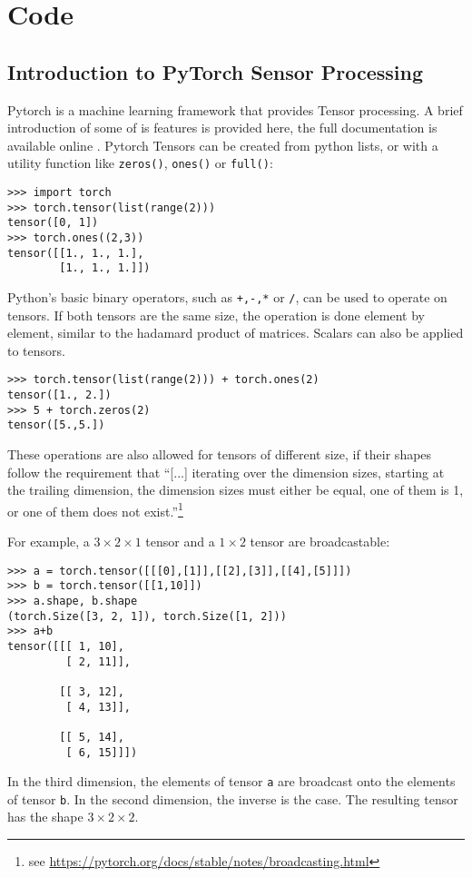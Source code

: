 \chapter{Code}
\section{Introduction to PyTorch Sensor Processing}
\label{app:pytorch_tutorial}
Pytorch is a machine learning framework that provides Tensor processing.
A brief introduction of some of is features is provided here,
the full documentation is available online \cite{pytorch}.
Pytorch Tensors can be created from python lists,
or with a utility function like \verb|zeros()|, \verb|ones()| or \verb|full()|:
\begin{lstlisting}
>>> import torch
>>> torch.tensor(list(range(2)))
tensor([0, 1])
>>> torch.ones((2,3))
tensor([[1., 1., 1.],
        [1., 1., 1.]])
\end{lstlisting}

Python's basic binary operators, such as \verb|+,-,*| or \verb|/|, can be used to operate on tensors.
If both tensors are the same size, the operation is done element by element, similar to the hadamard product of matrices.
Scalars can also be applied to tensors.
\begin{lstlisting}
>>> torch.tensor(list(range(2))) + torch.ones(2)
tensor([1., 2.])
>>> 5 + torch.zeros(2)
tensor([5.,5.])
\end{lstlisting}

These operations are also allowed for tensors of different size, if their shapes follow the requirement that
``[...] iterating over the dimension sizes, starting at the trailing dimension,
the dimension sizes must either be equal, one of them is 1, or one of them does not exist.''\footnote{
    see \url{https://pytorch.org/docs/stable/notes/broadcasting.html}
}\newpage

For example, a $3 \times 2\times 1$ tensor and a $1 \times 2$ tensor are broadcastable:
\begin{lstlisting}
>>> a = torch.tensor([[[0],[1]],[[2],[3]],[[4],[5]]])
>>> b = torch.tensor([[1,10]])
>>> a.shape, b.shape
(torch.Size([3, 2, 1]), torch.Size([1, 2]))
>>> a+b
tensor([[[ 1, 10],
         [ 2, 11]],

        [[ 3, 12],
         [ 4, 13]],

        [[ 5, 14],
         [ 6, 15]]])
\end{lstlisting}
In the third dimension, the elements of tensor \verb|a| are broadcast onto the elements of tensor \verb|b|.
In the second dimension, the inverse is the case. The resulting tensor has the shape $3 \times 2\times 2$.

